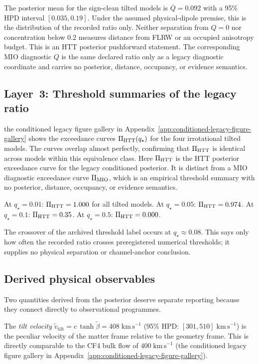 The posterior mean for the sign-clean tilted models is
$\bar{Q} = 0.092$ with a 95\% HPD
interval $[0.035, 0.19]$.  Under the assumed physical-dipole
premise, this is the distribution of the recorded ratio only.
Neither separation from $Q=0$ nor concentration below $0.2$
measures distance from FLRW or an occupied anisotropy budget.
This is an HTT posterior pushforward statement.  The corresponding
MIO diagnostic $Q$ is the same declared ratio only as a legacy
diagnostic coordinate and carries no posterior, distance,
occupancy, or evidence semantics.


\subsection{Layer~3: Threshold summaries of the legacy ratio}
\label{sec:layer3-results}

the conditioned legacy figure gallery in Appendix~\ref{app:conditioned-legacy-figure-gallery} shows the exceedance curves
$\Pi_{\rm HTT}(q_\star)$ for the four irrotational tilted models.  The
curves overlap almost perfectly, confirming that $\Pi_{\rm HTT}$ is
identical across models within this equivalence class.
Here $\Pi_{\rm HTT}$ is the HTT posterior exceedance curve for the
legacy conditioned posterior.  It is distinct from a MIO
diagnostic exceedance curve $\Pi_{\rm MIO}$, which is an empirical threshold
summary with no posterior, distance, occupancy, or evidence semantics.

At $q_\star = 0.01$: $\Pi_{\rm HTT} = 1.000$ for all tilted models.
At $q_\star = 0.05$: $\Pi_{\rm HTT} = 0.974$.
At $q_\star = 0.1$: $\Pi_{\rm HTT} = 0.35$.
At $q_\star = 0.5$: $\Pi_{\rm HTT} = 0.000$.

The crossover of the archived threshold label occurs at
$q_\star\approx0.08$.  This says only how often the recorded ratio
crosses preregistered numerical thresholds; it supplies no physical
separation or channel-anchor conclusion.


\subsection{Derived physical observables}
\label{sec:derived-results}

Two quantities derived from the posterior deserve separate
reporting because they connect directly to observational
programmes.

The \emph{tilt velocity}
$\tilde{v}_{\mathrm{tilt}} = c\,\tanh\tilde{\beta}
= 408\;\mathrm{km\,s}^{-1}$ (95\% HPD:
$[301, 510]\;\mathrm{km\,s}^{-1}$)
is the peculiar velocity of the matter frame relative to the
geometry frame.  This is directly comparable to the CF4 bulk
flow of $400\;\mathrm{km\,s}^{-1}$
(the conditioned legacy figure gallery in Appendix~\ref{app:conditioned-legacy-figure-gallery}).

